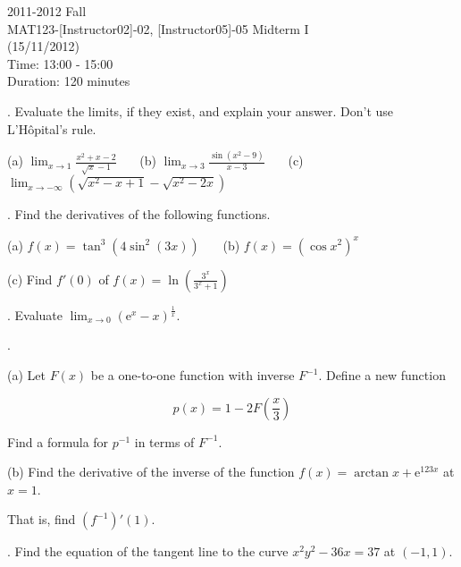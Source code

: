 \documentclass{article}
\begin{document}
\pagestyle{empty}
\large

\begin{center}
2011-2012 Fall \\MAT123-[Instructor02]-02, [Instructor05]-05 Midterm I\\(15/11/2012)\\Time: 13:00 - 15:00\\Duration: 120 minutes
\end{center}

. Evaluate the limits, if they exist, and explain your answer. Don't use L'Hôpital's rule.

\hfill

(a) $\displaystyle \lim_{x\to 1} \frac{x^2+x-2}{\sqrt x-1}$ \ \ \ (b) $\displaystyle \lim_{x\to 3} \frac{\sin(x^2-9)}{x-3}$ \ \ \ (c) $\displaystyle \lim_{x\to -\infty}\left(\sqrt{x^2-x+1}-\sqrt{x^2-2x}\right)$

\hfill

. Find the derivatives of the following functions.

\hfill

(a) $\displaystyle f(x) = \tan^3\left(4\sin^2(3x)\right)$ \ \ \ (b) $\displaystyle f(x) = \left(\cos x^2\right)^x$

\hfill

(c) Find $f'(0)$ of $\displaystyle f(x)=\ln\left(\frac{3^x}{3^x+1}\right)$

\hfill

. Evaluate $\displaystyle \lim_{x\to0}\left(\mathrm{e}^x-x\right)^{\frac1x}$.

\hfill

.

\hfill

(a) Let $F(x)$ be a one-to-one function with inverse $F^{-1}$. Define a new function

\begin{equation*}
p(x) = 1-2F\left(\frac x3\right)
\end{equation*}

Find a formula for $p^{-1}$ in terms of $F^{-1}$.

\hfill

(b) Find the derivative of the inverse of the function $f(x) = \arctan x + \mathrm{e}^{123x}$ at $x=1$.

That is, find $\left(f^{-1}\right)'(1)$.

\hfill

. Find the equation of the tangent line to the curve $x^2y^2-36x=37$ at $(-1, 1)$.
\end{document}

